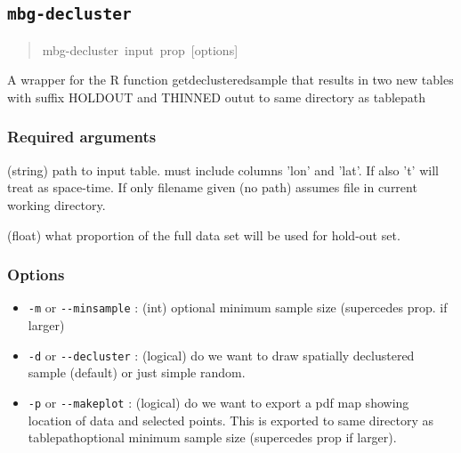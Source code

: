 


\subsection{\texttt{mbg-decluster}}
\label{sec:mbg-decluster}
\begin{quote}{\ttfamily \raggedright \noindent
mbg-decluster~input~prop~{[}options{]}
}\end{quote}

A wrapper for the R function getdeclusteredsample that results in two new tables with
suffix HOLDOUT and THINNED outut to same directory as tablepath





\subsubsection{Required arguments}
\label{sec:id4}
\setcounter{listcnt0}{0}
\begin{list}{.}
{
\setlength{\rightmargin}{\leftmargin}
}
\item {} 
(string) path to input table. must include columns 'lon' and 'lat'. If
also 't' will treat as space-time. If only filename given (no path) assumes file
in current working directory.

\item {} 
(float) what proportion of the full data set will be used for hold-out set.

\end{list}





\subsubsection{Options}
\label{sec:id5}
\begin{itemize}
\item {} 
\texttt{-m} or \texttt{-{}-minsample} : (int) optional minimum sample size (supercedes prop.
if larger)

\item {} 
\texttt{-d} or \texttt{-{}-decluster} : (logical) do we want to draw spatially declustered
sample (default) or just simple random.

\item {} 
\texttt{-p} or \texttt{-{}-makeplot} : (logical) do we want to export a pdf map showing
location of data and selected points. This is exported to same directory as
tablepathoptional minimum sample size (supercedes prop if larger).

\end{itemize}


